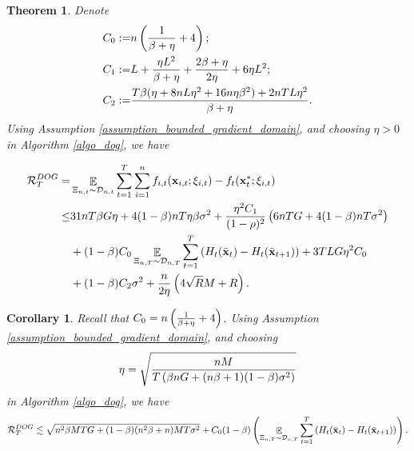 \documentclass{article}
\newtheorem{Theorem}{\bf{Theorem}}
\newtheorem{Corollary}{\bf{Corollary}}
\begin{document}
\begin{Theorem}
\label{theorem_regret_upper_bound}
Denote 
\begin{align}
\nonumber
C_0 := & n\left( \frac{1}{\beta + \eta} + 4 \right); \\ \nonumber
C_1 := & L +  \frac{\eta L^2}{\beta + \eta} + \frac{2\beta + \eta}{2\eta} + 6\eta L^2; \\ \nonumber
C_2 := & \frac{T\beta(\eta + 8nL\eta^2 + 16n\eta\beta^2) + 2nTL\eta^2}{\beta + \eta }.
\end{align} Using Assumption \ref{assumption_bounded_gradient_domain}, and choosing $\eta>0$ in Algorithm \ref{algo_dog}, we have

\begin{align}
\nonumber
{\mathcal{R}}_T^{DOG} = & \mathop{\mathbb{E}}_{ \Xi_{n,t} \sim \mathcal{D}_{n,t} } \sum_{t=1}^T\sum_{i=1}^n f_{i,t}({\bf x}_{i,t};\xi_{i,t}) - f_t({\bf x}_t^\ast;\xi_{i,t}) \\ \nonumber
\le & 31 nT\beta G \eta + 4(1-\beta)nT\eta \beta\sigma^2 +  \frac{\eta^2C_1}{(1-\rho)^2}   \left(  6nTG + 4(1-\beta)nT \sigma^2  \right) \\ \nonumber 
&+ (1-\beta) C_0  \mathop{\mathbb{E}}_{ \Xi_{n,T} \sim \mathcal{D}_{n,T} }\sum_{t=1}^T \left( H_t(\bar{{\bf x}}_t) - H_t(\bar{{\bf x}}_{t+1}) \right) + 3TLG\eta^2C_0 \\ \nonumber 
& + (1-\beta) C_2  \sigma^2  + \frac{n}{2\eta}\left(  4\sqrt{R}M + R   \right).
\end{align} 
\end{Theorem}


\begin{Corollary}
Recall that $C_0 = n\left(  \frac{1}{\beta + \eta} + 4 \right)$.
Using Assumption \ref{assumption_bounded_gradient_domain}, and choosing 
\begin{align}
\nonumber
\eta = \sqrt{  \frac{nM }{ T \left(  \beta nG + (n\beta+1)(1-\beta)\sigma^2  \right)  }  }
\end{align} in Algorithm \ref{algo_dog}, we have
\begin{align}
\nonumber
{\mathcal{R}}_T^{DOG} \lesssim \sqrt{ n^2 \beta MTG + (1-\beta)(n^2\beta + n)MT\sigma^2 } + C_0 (1-\beta) \left(  \mathop{\mathbb{E}}_{ \Xi_{n,T} \sim \mathcal{D}_{n,T} }\sum_{t=1}^T \left( H_t(\bar{{\bf x}}_t) - H_t(\bar{{\bf x}}_{t+1}) \right)  \right).
\end{align}






\end{Corollary}
\end{document}
